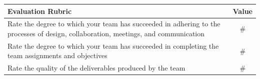 \documentclass[12pt,a4paper]{article}
\begin{document}
\begin{table}[htdp]
\footnotesize
\centering
\begin{tabulary}{\linewidth}{|L|c|}
\hline
{}Evaluation Rubric & Value \\
\hline
Rate the degree to which your team has succeeded in adhering to the processes of design, collaboration, meetings, and communication & \# \\ %
\hline
Rate the degree to which your team has succeeded in completing the
team assignments and objectives & \# \\ %
\hline
Rate the quality of the deliverables produced by the team & \# \\ %
\hline
\end{tabulary}
\label{tab:team1}
\end{table}%
\end{document}
